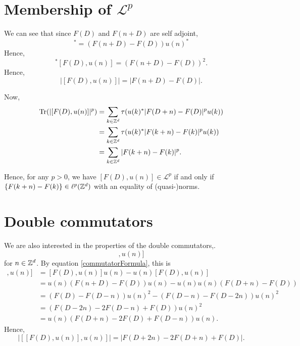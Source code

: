 \section{Membership of $\mathcal{L}^p$}
\label{LpConditions}
We can see that since $F(D)$ and $F(n+D)$ are self adjoint, 
\begin{equation}
    [F(D),u(n)]^* = (F(n+D)-F(D))u(n)^*
\end{equation}
Hence,
\begin{equation}
    [F(D),u(n)]^*[F(D),u(n)] = (F(n+D)-F(D))^2.
\end{equation}
Hence,
\begin{equation}
    |[F(D),u(n)]| = |F(n+D)-F(D)|.
\end{equation}

Now,
\begin{align}
    \operatorname{Tr}(|[F(D),u(n)]|^p) &= \sum_{k \in \mathbb{Z}^d} \tau(u(k)^*|F(D+n)-F(D)|^pu(k))\\
    &= \sum_{k \in \mathbb{Z}^d} \tau(u(k)^*|F(k+n)-F(k)|^pu(k))\\
    &= \sum_{k \in \mathbb{Z}^d} |F(k+n)-F(k)|^p.
\end{align}

Hence, for any $p > 0$, we have $[F(D),u(n)] \in \mathcal{L}^p$ if and only if
$\{F(k+n)-F(k)\} \in \ell^p(\mathbb{Z}^d)$ with an equality of (quasi-)norms.


\section{Double commutators}

We are also interested in the properties of the double commutators,.
\begin{equation*}
    [[F(D),u(n)],u(n)]
\end{equation*}
for $n \in \mathbb{Z}^d$. By equation \ref{commutatorFormula}, this is
\begin{align}
    [[F(D),u(n)],u(n)] &= [F(D),u(n)]u(n) - u(n)[F(D),u(n)] \\
                       &= u(n)(F(n+D)-F(D))u(n)-u(n)u(n)(F(D+n)-F(D))\\
                       &= (F(D)-F(D-n))u(n)^2-(F(D-n)-F(D-2n))u(n)^2\\
                       &= (F(D-2n)-2F(D-n)+F(D))u(n)^2\\
                       &= u(n)(F(D+n)-2F(D)+F(D-n))u(n).
\end{align}
Hence,
\begin{equation*}
    |[[F(D),u(n)],u(n)]| = |F(D+2n)-2F(D+n)+F(D)|.
\end{equation*}


